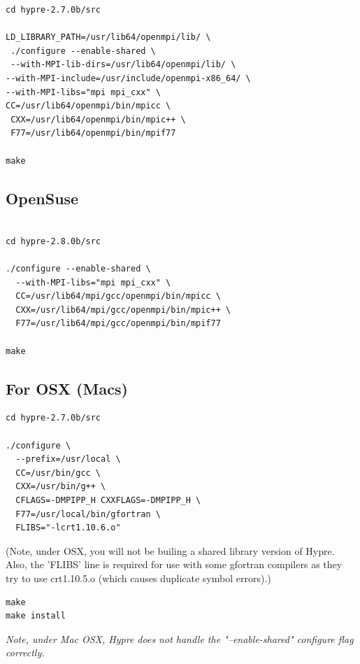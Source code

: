 \documentclass[12pt]{article}
\begin{document}
\begin{verbatim}
cd hypre-2.7.0b/src

LD_LIBRARY_PATH=/usr/lib64/openmpi/lib/ \
 ./configure --enable-shared \
 --with-MPI-lib-dirs=/usr/lib64/openmpi/lib/ \
--with-MPI-include=/usr/include/openmpi-x86_64/ \
--with-MPI-libs="mpi mpi_cxx" \
CC=/usr/lib64/openmpi/bin/mpicc \
 CXX=/usr/lib64/openmpi/bin/mpic++ \
 F77=/usr/lib64/openmpi/bin/mpif77

make

\end{verbatim}

\subsection{OpenSuse}

\begin{verbatim}

cd hypre-2.8.0b/src

./configure --enable-shared \
  --with-MPI-libs="mpi mpi_cxx" \
  CC=/usr/lib64/mpi/gcc/openmpi/bin/mpicc \
  CXX=/usr/lib64/mpi/gcc/openmpi/bin/mpic++ \
  F77=/usr/lib64/mpi/gcc/openmpi/bin/mpif77

make

\end{verbatim}

\subsection{For OSX (Macs)}

\begin{verbatim}
cd hypre-2.7.0b/src

./configure \
  --prefix=/usr/local \
  CC=/usr/bin/gcc \
  CXX=/usr/bin/g++ \
  CFLAGS=-DMPIPP_H CXXFLAGS=-DMPIPP_H \
  F77=/usr/local/bin/gfortran \
  FLIBS="-lcrt1.10.6.o"

\end{verbatim}

(Note, under OSX, you will not be builing a shared library version of
Hypre.  Also, the 'FLIBS' line is required for use with some gfortran
compilers as they try to use crt1.10.5.o (which causes duplicate
symbol errors).)

\begin{verbatim}
make
make install
\end{verbatim}

\emph{Note, under Mac OSX, Hypre does not handle the "--enable-shared" configure
  flag correctly.}
\end{document}

